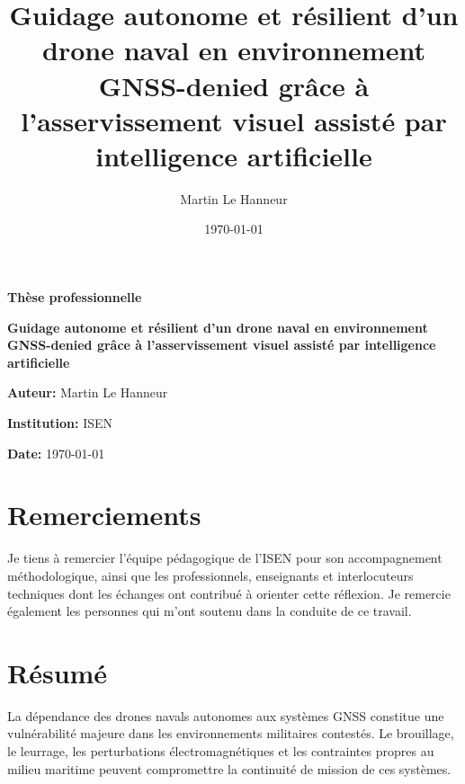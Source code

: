 \documentclass[12pt, a4paper, twoside, openright]{report}
\title{Guidage autonome et résilient d'un drone naval en environnement GNSS-denied grâce à l'asservissement visuel assisté par intelligence artificielle}
\author{Martin Le Hanneur}
\date{\today}
\begin{document}
\begin{titlepage}
    \begin{center}
        \vspace*{\fill}
        
        {\Huge \textbf{Thèse professionnelle} \par}
        \vspace{1.5cm}
        
        {\LARGE \textbf{Guidage autonome et résilient d'un drone naval en environnement GNSS-denied grâce à l'asservissement visuel assisté par intelligence artificielle} \par}
        
        \vspace{2cm}
        
        {\Large \textbf{Auteur:} Martin Le Hanneur \par}
        \vspace{0.5cm}
        {\large \textbf{Institution:} ISEN \par}
        {\large \textbf{Date:} \today \par}
        
        \vspace*{\fill}
    \end{center}
\end{titlepage}

\cleardoublepage

\chapter*{Remerciements}
Je tiens à remercier l'équipe pédagogique de l'ISEN pour son accompagnement méthodologique, ainsi que les professionnels, enseignants et interlocuteurs techniques dont les échanges ont contribué à orienter cette réflexion. Je remercie également les personnes qui m'ont soutenu dans la conduite de ce travail.

\cleardoublepage

\chapter*{Résumé}

La dépendance des drones navals autonomes aux systèmes GNSS constitue une vulnérabilité majeure dans les environnements militaires contestés. Le brouillage, le leurrage, les perturbations électromagnétiques et les contraintes propres au milieu maritime peuvent compromettre la continuité de mission de ces systèmes. 
\end{document}
